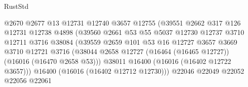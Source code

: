 \begin{lexlean}{RustStd}
\begin{coremodule}
                                        @2670
                                        @2677
                                        @13
                                        @12731
                                        @12740
                                        @3657
                                        @12755
                                        (@39551
                                          @2662
                                          @317
                                          @126
                                          @12731
                                          @12738
                                          @4898
                                          (@39560
                                            @2661
                                            @53
                                            @55
                                            @5037
                                            @12730
                                            @12737
                                            @3710
                                            @12711
                                            @3716
                                            @38084
                                            (@39559
                                              @2659
                                              @101
                                              @53
                                              @16
                                              @12727
                                              @3657
                                              @3669
                                              @3710
                                              @12721
                                              @3716
                                              (@38044
                                                @2658
                                                @12727
                                                (@16464 (@16465 @12727))
                                                (@16016 (@16470 @2658 @53)))
                                              @38011
                                              @16400
                                              (@16016 (@16402 @12722 @3657)))
                                            @16400
                                            (@16016 (@16402 @12712 @12730)))
                                          @22046
                                          @22049
                                          @22052
                                          @22056
                                          @22061

\end{coremodule}
\end{lexlean}
